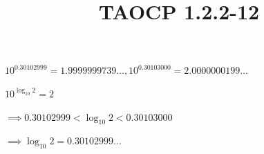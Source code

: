 \documentclass{article}
\title{TAOCP 1.2.2\mbox{-}12}
\begin{document}
\maketitle

\( 10^{0.30102999} = 1.9999999739\ldots , 10^{0.30103000} = 2.0000000199\ldots \)

\( 10^{\log_{10} 2} = 2 \)

\( \implies 0.30102999 < \log_{10} 2 < 0.30103000 \)

\( \implies \log_{10} 2 = 0.30102999\ldots \)
\end{document}
